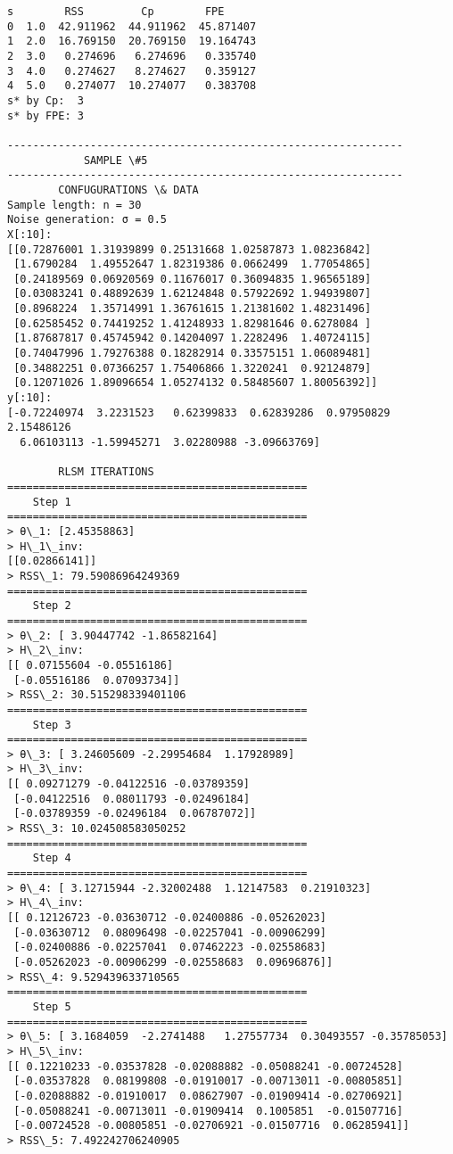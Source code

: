 \documentclass[11pt]{article}
\begin{document}
    \begin{Verbatim}[commandchars=\\\{\}]
     s        RSS         Cp        FPE
0  1.0  42.911962  44.911962  45.871407
1  2.0  16.769150  20.769150  19.164743
2  3.0   0.274696   6.274696   0.335740
3  4.0   0.274627   8.274627   0.359127
4  5.0   0.274077  10.274077   0.383708
s* by Cp:  3
s* by FPE: 3

--------------------------------------------------------------
			SAMPLE \#5
--------------------------------------------------------------
		CONFUGURATIONS \& DATA
Sample length: n = 30
Noise generation: σ = 0.5
X[:10]:
[[0.72876001 1.31939899 0.25131668 1.02587873 1.08236842]
 [1.6790284  1.49552647 1.82319386 0.0662499  1.77054865]
 [0.24189569 0.06920569 0.11676017 0.36094835 1.96565189]
 [0.03083241 0.48892639 1.62124848 0.57922692 1.94939807]
 [0.8968224  1.35714991 1.36761615 1.21381602 1.48231496]
 [0.62585452 0.74419252 1.41248933 1.82981646 0.6278084 ]
 [1.87687817 0.45745942 0.14204097 1.2282496  1.40724115]
 [0.74047996 1.79276388 0.18282914 0.33575151 1.06089481]
 [0.34882251 0.07366257 1.75406866 1.3220241  0.92124879]
 [0.12071026 1.89096654 1.05274132 0.58485607 1.80056392]]
y[:10]:
[-0.72240974  3.2231523   0.62399833  0.62839286  0.97950829  2.15486126
  6.06103113 -1.59945271  3.02280988 -3.09663769]

		RLSM ITERATIONS
===============================================
	Step 1
===============================================
> θ\_1: [2.45358863]
> H\_1\_inv:
[[0.02866141]]
> RSS\_1: 79.59086964249369
===============================================
	Step 2
===============================================
> θ\_2: [ 3.90447742 -1.86582164]
> H\_2\_inv:
[[ 0.07155604 -0.05516186]
 [-0.05516186  0.07093734]]
> RSS\_2: 30.515298339401106
===============================================
	Step 3
===============================================
> θ\_3: [ 3.24605609 -2.29954684  1.17928989]
> H\_3\_inv:
[[ 0.09271279 -0.04122516 -0.03789359]
 [-0.04122516  0.08011793 -0.02496184]
 [-0.03789359 -0.02496184  0.06787072]]
> RSS\_3: 10.024508583050252
===============================================
	Step 4
===============================================
> θ\_4: [ 3.12715944 -2.32002488  1.12147583  0.21910323]
> H\_4\_inv:
[[ 0.12126723 -0.03630712 -0.02400886 -0.05262023]
 [-0.03630712  0.08096498 -0.02257041 -0.00906299]
 [-0.02400886 -0.02257041  0.07462223 -0.02558683]
 [-0.05262023 -0.00906299 -0.02558683  0.09696876]]
> RSS\_4: 9.529439633710565
===============================================
	Step 5
===============================================
> θ\_5: [ 3.1684059  -2.2741488   1.27557734  0.30493557 -0.35785053]
> H\_5\_inv:
[[ 0.12210233 -0.03537828 -0.02088882 -0.05088241 -0.00724528]
 [-0.03537828  0.08199808 -0.01910017 -0.00713011 -0.00805851]
 [-0.02088882 -0.01910017  0.08627907 -0.01909414 -0.02706921]
 [-0.05088241 -0.00713011 -0.01909414  0.1005851  -0.01507716]
 [-0.00724528 -0.00805851 -0.02706921 -0.01507716  0.06285941]]
> RSS\_5: 7.492242706240905


\end{Verbatim}
\end{document}
